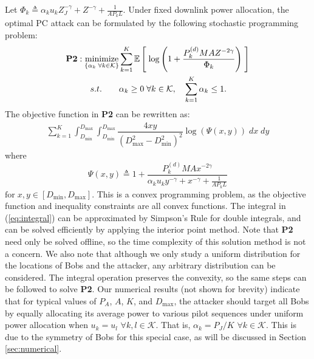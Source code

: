 \documentclass[draftclsnofoot, 12pt, onecolumn, journal]{IEEEtran}
\begin{document}
Let $\Phi_k \triangleq \alpha_k u_k Z_J^{-\gamma} + Z^{-\gamma} + \frac{1}{A P_k L}$.
Under fixed downlink power allocation, the optimal PC attack can be formulated by the following stochastic programming problem: 
%
\begin{align}
\textbf{P2}:
\underset{ 
\begin{subarray} \\
\{\alpha_k \; \forall k \in \mathcal{K}\} \end{subarray} }{\text{minimize}} 
&  \sum_{k = 1}^K \mathbb{E} \left[\; \log \left( 1 +  \frac{ P_k^{(d)} M A Z^{-2\gamma}}{ \Phi_k  } \right) \; \right] \nonumber \\
 s.t. \quad \quad & \alpha_k \geq 0  \; \forall k \in \mathcal{K}, \quad \sum_{k = 1}^K \alpha_k \leq 1. \nonumber
\end{align}
%
The objective function in \textbf{P2} can be rewritten as:
%
\begin{align}
\sum_{k = 1}^K  \int_{D_{\mathrm{min}}}^{D_{\mathrm{max}}} \int_{D_{\mathrm{min}}}^{D_{\mathrm{max}}} \dfrac{4xy}{(D_{\mathrm{max}}^2 - D_{\mathrm{min}}^2)^2}  \log (\Psi(x,y)) \; d x \; d y 
\label{eq:integral}
\end{align}
%
where
$$ \Psi(x,y) \triangleq 1 +  \frac{ P_k^{(d)} M A x^{-2\gamma}}{ \alpha_k u_k y^{-\gamma} + x^{-\gamma} + \frac{1}{A P_k L}  } $$
$\mathrm{for} \; x,y \in [D_{\mathrm{min}},D_{\mathrm{max}} ]$.
This is a convex programming problem, as the objective function and inequality constraints are all convex functions.
The integral in (\ref{eq:integral}) can be approximated by Simpson's Rule for double integrals, and can be solved efficiently by applying the interior point method.
Note that \textbf{P2} need only be solved offline, so the time complexity of this solution method is not a concern.
We also note that although we only study a uniform distribution for the locations of Bobs and the attacker, any arbitrary distribution can be considered.
The integral operation preserves the convexity, so the same steps can be followed to solve \textbf{P2}.
Our numerical results (not shown for brevity) indicate that for typical values of $P_A$, $A$, $K$, and $D_{\mathrm{max}}$, the attacker should target all Bobs by equally allocating its average power to various pilot sequences under uniform power allocation when $u_k = u_l$ $\forall k, l \in \mathcal{K}$.
That is, $\alpha_k = P_J / K $ $\forall k \in \mathcal{K}$.
This is due to the symmetry of Bobs for this special case, as will be discussed in Section \ref{sec:numerical}. 
\end{document}
